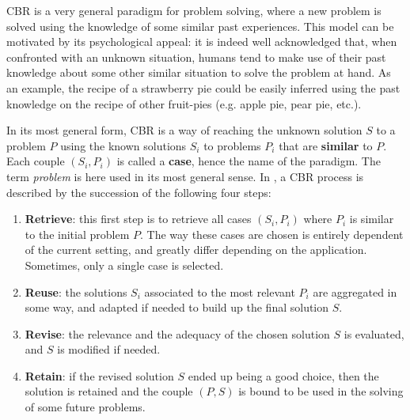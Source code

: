 CBR is a very general paradigm for problem solving, where a new problem is
solved using the knowledge of some similar past experiences. This model can be
motivated by its psychological appeal: it is indeed well acknowledged that,
when confronted with an unknown situation, humans tend to make use of their
past knowledge about some other similar situation to solve the problem at hand.
As an example, the recipe of a strawberry pie could be easily inferred using
the past knowledge on the recipe of other fruit-pies (e.g. apple pie, pear pie,
etc.).

In its most general form, CBR is a way of reaching the unknown solution $S$ to a
problem $P$ using the known solutions $S_i$ to problems $P_i$ that are
\textbf{similar} to $P$. Each couple $(S_i, P_i)$ is called a \textbf{case},
hence the name of the paradigm.  The term \textit{problem} is here used in its
most general sense.  In \cite{AamPla94}, a CBR process is described by the
succession of the following four steps:
\begin{enumerate}
  \item \textbf{Retrieve}: this first step is to retrieve all cases $(S_i,
    P_i)$ where $P_i$ is similar to the initial problem $P$. The way these
    cases are chosen is entirely dependent of the current setting, and greatly
    differ depending on the application. Sometimes, only a single case  is
    selected.
  \item \textbf{Reuse}: the solutions $S_i$ associated to the most relevant
    $P_i$ are aggregated in some way, and adapted if needed to build up the
    final solution $S$.
  \item \textbf{Revise}: the relevance and the adequacy of the chosen solution
    $S$ is evaluated, and $S$ is modified if needed.
  \item \textbf{Retain}: if the revised solution $S$ ended up being a good
    choice, then the solution is retained and the couple $(P, S)$ is bound to
    be used in the solving of some future problems.
\end{enumerate}


